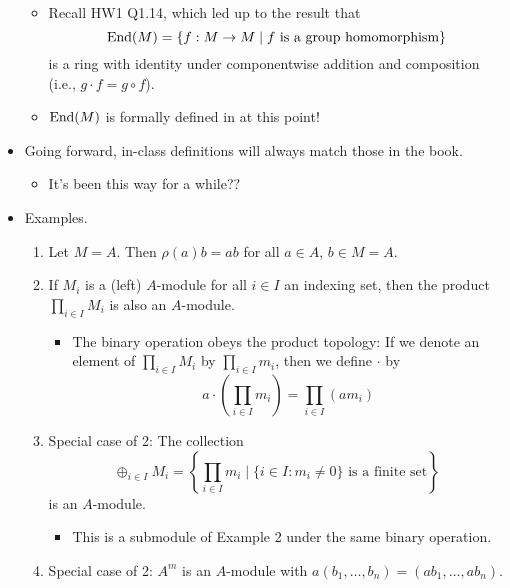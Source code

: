 \documentclass[../notes.tex]{subfiles}
\begin{document}
\begin{itemize}
\begin{itemize}
        \item Recall HW1 Q1.14, which led up to the result that
        \begin{equation*}
            \operatorname{End}(M) = \{f:M\to M\mid f\text{ is a group homomorphism}\}
        \end{equation*}
        is a ring with identity under componentwise addition and composition (i.e., $g\cdot f=g\circ f$).
        \item $\operatorname{End}(M)$ is formally defined in \textcite{bib:DummitFoote} at this point!
    \end{itemize}
    \item Going forward, in-class definitions will always match those in the book.
    \begin{itemize}
        \item It's been this way for a while??
    \end{itemize}
    \item Examples.
    \begin{enumerate}
        \item Let $M=A$. Then $\rho(a)b=ab$ for all $a\in A$, $b\in M=A$.
        \item If $M_i$ is a (left) $A$-module for all $i\in I$ an indexing set, then the product $\prod_{i\in I}M_i$ is also an $A$-module.
        \begin{itemize}
            \item The binary operation obeys the product topology: If we denote an element of $\prod_{i\in I}M_i$ by $\prod_{i\in I}m_i$, then we define $\cdot$ by
            \begin{equation*}
                a\cdot\left( \prod_{i\in I}m_i \right) = \prod_{i\in I}(am_i)
            \end{equation*}
        \end{itemize}
        \item Special case of 2: The collection
        \begin{equation*}
            \oplus_{i\in I}M_i = \left\{ \prod_{i\in I}m_i\mid\{i\in I:m_i\neq 0\}\text{ is a finite set} \right\}
        \end{equation*}
        is an $A$-module.
        \begin{itemize}
            \item This is a submodule of Example 2 under the same binary operation.
        \end{itemize}
        \item Special case of 2: $A^m$ is an $A$-module with $a(b_1,\dots,b_n)=(ab_1,\dots,ab_n)$.

\end{enumerate}
\end{itemize}
\end{document}
